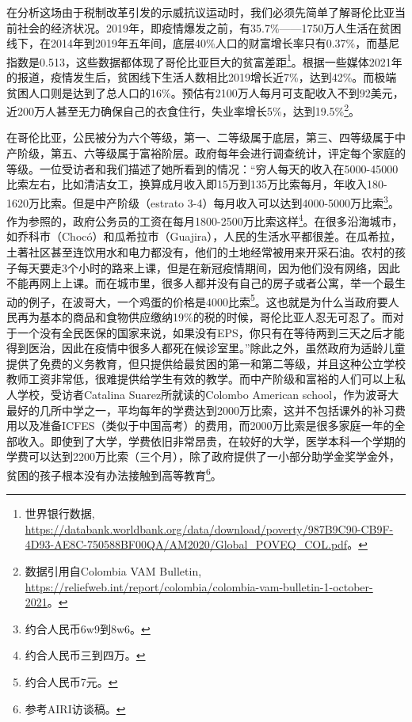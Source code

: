 \documentclass{phyasgn}\usepackage{nag}
\begin{document}
        \par 在分析这场由于税制改革引发的示威抗议运动时，我们必须先简单了解哥伦比亚当前社会的经济状况。2019年，即疫情爆发之前，有35.7\%——1750万人生活在贫困线下，在2014年到2019年五年间，底层40\%人口的财富增长率只有0.37\%，而基尼指数是0.513，这些数据都体现了哥伦比亚巨大的贫富差距\footnote[5]{世界银行数据,\\\quad
        \url{https://databank.worldbank.org/data/download/poverty/987B9C90-CB9F-4D93-AE8C-750588BF00QA/AM2020/Global_POVEQ_COL.pdf}。}。根据一些媒体2021年的报道，疫情发生后，贫困线下生活人数相比2019增长近7\%，达到42\%。而极端贫困人口则是达到了总人口的16\%。预估有2100万人每月可支配收入不到92美元，近200万人甚至无力确保自己的衣食住行，失业率增长5\%，达到19.5\%\footnote[6]{数据引用自Colombia VAM Bulletin,\\\quad
        \url{https://reliefweb.int/report/colombia/colombia-vam-bulletin-1-october-2021}。}。
        \par 在哥伦比亚，公民被分为六个等级，第一、二等级属于底层，第三、四等级属于中产阶级，第五、六等级属于富裕阶层。政府每年会进行调查统计，评定每个家庭的等级。一位受访者和我们描述了她所看到的情况：“穷人每天的收入在5000-45000比索左右，比如清洁女工，换算成月收入即15万到135万比索每月，年收入180-1620万比索。但是中产阶级（estrato 3-4）每月收入可以达到4000-5000万比索\footnote[7]{约合人民币6w9到8w6。}。作为参照的，政府公务员的工资在每月1800-2500万比索这样\footnote[8]{约合人民币三到四万。}。在很多沿海城市，如乔科市（Chocó）和瓜希拉市（Guajira），人民的生活水平都很差。在瓜希拉，土著社区甚至连饮用水和电力都没有，他们的土地经常被用来开采石油。农村的孩子每天要走3个小时的路来上课，但是在新冠疫情期间，因为他们没有网络，因此不能再网上上课。而在城市里，很多人都并没有自己的房子或者公寓，举一个最生动的例子，在波哥大，一个鸡蛋的价格是4000比索\footnote[9]{约合人民币7元。}。这也就是为什么当政府要人民再为基本的商品和食物供应缴纳19\%的税的时候，哥伦比亚人忍无可忍了。而对于一个没有全民医保的国家来说，如果没有EPS，你只有在等待两到三天之后才能得到医治，因此在疫情中很多人都死在候诊室里。”除此之外，虽然政府为适龄儿童提供了免费的义务教育，但只提供给最贫困的第一和第二等级，并且这种公立学校教师工资非常低，很难提供给学生有效的教学。而中产阶级和富裕的人们可以上私人学校，受访者Catalina Suarez所就读的Colombo American school，作为波哥大最好的几所中学之一，平均每年的学费达到2000万比索，这并不包括课外的补习费用以及准备ICFES（类似于中国高考）的费用，而2000万比索是很多家庭一年的全部收入。即使到了大学，学费依旧非常昂贵，在较好的大学，医学本科一个学期的学费可以达到2200万比索（三个月），除了政府提供了一小部分助学金奖学金外，贫困的孩子根本没有办法接触到高等教育\footnote[10]{参考AIRI访谈稿。}。
\end{document}
